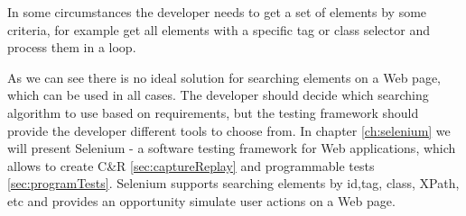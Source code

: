 		In some circumstances the developer needs to get a set of elements by some
		criteria, for example get all elements with a specific tag or class selector
		and process them in a loop. 
		
		As we can see there is no ideal solution for searching elements on a Web page,
		which can be used in all cases. The developer should decide which
		searching algorithm to use based on requirements, but the testing framework
		should provide the developer different tools to choose from. In chapter
		\ref{ch:selenium} we will present Selenium - a software testing framework
		for Web applications, which allows to create C\&R \ref{sec:captureReplay} and 
    programmable tests \ref{sec:programTests}. Selenium  supports searching
    elements by id,tag, class, XPath, etc and provides an opportunity simulate
    user actions on a Web page.
		

 